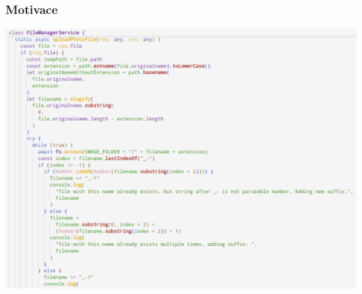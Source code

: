 




\begin{frame}
  \frametitle{Motivace}
  \begin{center}
    \includegraphics[width=\textwidth]{img/01-scary-screenshot-1.png}
  \end{center}
\end{frame}

